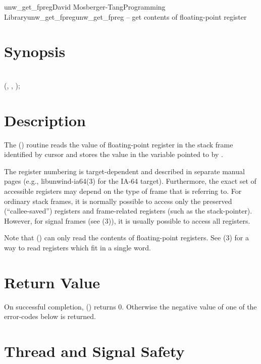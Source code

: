 \documentclass{article}
\begin{document}
\begin{Name}{3}{unw\_get\_fpreg}{David Mosberger-Tang}{Programming Library}{unw\_get\_fpreg}unw\_get\_fpreg -- get contents of floating-point register
\end{Name}

\section{Synopsis}

\\

 (,  , );\\

\section{Description}

The () routine reads the value of floating-point
register  in the stack frame identified by cursor 
and stores the value in the variable pointed to by .

The register numbering is target-dependent and described in separate
manual pages (e.g., libunwind-ia64(3) for the IA-64 target).
Furthermore, the exact set of accessible registers may depend on the
type of frame that  is referring to.  For ordinary stack
frames, it is normally possible to access only the preserved
(``callee-saved'') registers and frame-related registers (such as the
stack-pointer).  However, for signal frames (see
(3)), it is usually possible to access
all registers.

Note that () can only read the contents of
floating-point registers.  See (3) for a way to
read registers which fit in a single word.

\section{Return Value}

On successful completion, () returns 0.
Otherwise the negative value of one of the error-codes below is
returned.

\section{Thread and Signal Safety}
\end{document}
